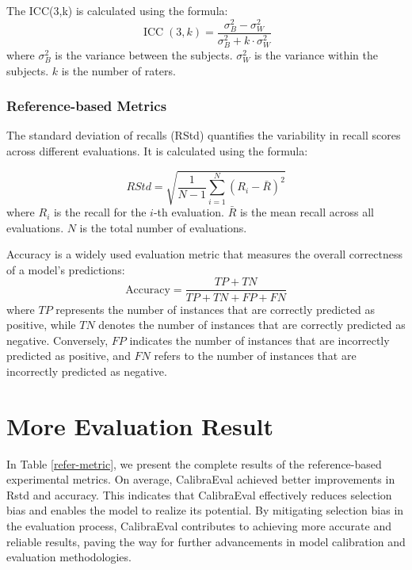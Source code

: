 \documentclass[sigconf]{acmart}
\begin{document}
The ICC(3,k) is calculated using the formula:
\begin{equation} \label{eq:partial_3}
\operatorname{ICC}(3, k)=\frac{\sigma_{B}^{2}-\sigma_{W}^{2}}{\sigma_{B}^{2}+k \cdot \sigma_{W}^{2}}
\end{equation}
where $\sigma_{B}^{2}$ is the variance between the subjects.  $\sigma_{W}^{2}$ is the variance within the subjects. $k$ is the number of raters.

\subsubsection{Reference-based Metrics}

The standard deviation of recalls (RStd) quantifies the variability in recall scores across different evaluations. It is calculated using the formula:

\begin{equation} \label{eq:partial_4}
RStd=\sqrt{\frac{1}{N-1} \sum_{i=1}^{N}\left(R_{i}-\bar{R}\right)^{2}}
\end{equation}
where $R_{i}$ is the recall for the $i$-th evaluation. $\bar{R}$ is the mean recall across all evaluations. $N$ is the total number of evaluations.


Accuracy is a widely used evaluation metric that measures the overall correctness of a model's predictions:
\begin{equation} \label{eq:partial_5}
\text{Accuracy}=\frac{TP+TN}{TP+TN+FP+FN}
\end{equation}
where $TP$ represents the number of instances that are correctly predicted as positive, while $TN$ denotes the number of instances that are correctly predicted as negative. Conversely, $FP$ indicates the number of instances that are incorrectly predicted as positive, and $FN$ refers to the number of instances that are incorrectly predicted as negative.

\section{More Evaluation Result}
\label{more_results}
In Table \ref{refer-metric}, we present the complete results of the reference-based experimental metrics. On average, CalibraEval achieved better improvements in Rstd and accuracy. This indicates that CalibraEval effectively reduces selection bias and enables the model to realize its potential. By mitigating selection bias in the evaluation process, CalibraEval contributes to achieving more accurate and reliable results, paving the way for further advancements in model calibration and evaluation methodologies.
\end{document}
